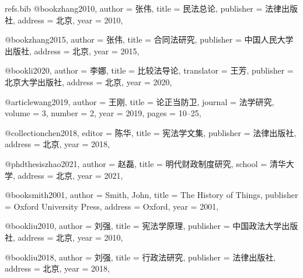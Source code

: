 
\begin{filecontents*}[overwrite]{refs.bib}
@book{zhang2010,
	author    = {张伟},
	title     = {民法总论},
	publisher = {法律出版社},
	address   = {北京},
	year      = {2010},
}

@book{zhang2015,
	author    = {张伟},
	title     = {合同法研究},
	publisher = {中国人民大学出版社},
	address   = {北京},
	year      = {2015},
}

@book{li2020,
	author     = {李娜},
	title      = {比较法导论},
	translator = {王芳},
	publisher  = {北京大学出版社},
	address    = {北京},
	year       = {2020},
}

@article{wang2019,
	author    = {王刚},
	title     = {论正当防卫},
	journal   = {法学研究},
	volume    = {3},
	number    = {2},
	year      = {2019},
	pages     = {10--25},
}

@collection{chen2018,
	editor    = {陈华},
	title     = {宪法学文集},
	publisher = {法律出版社},
	address   = {北京},
	year      = {2018},
}

@phdthesis{zhao2021,
	author = {赵磊},
	title  = {明代财政制度研究},
	school = {清华大学},
	address = {北京},
	year   = {2021},
}

@book{smith2001,
	author    = {Smith, John},
	title     = {The History of Things},
	publisher = {Oxford University Press},
	address   = {Oxford},
	year      = {2001},
}

@book{liu2010,
	author    = {刘强},
	title     = {宪法学原理},
	publisher = {中国政法大学出版社},
	address   = {北京},
	year      = {2010},
}

@book{liu2018,
	author    = {刘强},
	title     = {行政法研究},
	publisher = {法律出版社},
	address   = {北京},
	year      = {2018},
}
\end{filecontents*}

\documentclass{ctexart}

\usepackage[style=chinese-verbose-trad2,
            language=chinese,
            ibidpage=true,
            backend=biber]{biblatex}





\section*{汉化 verbose-trad2 脚注示例}


